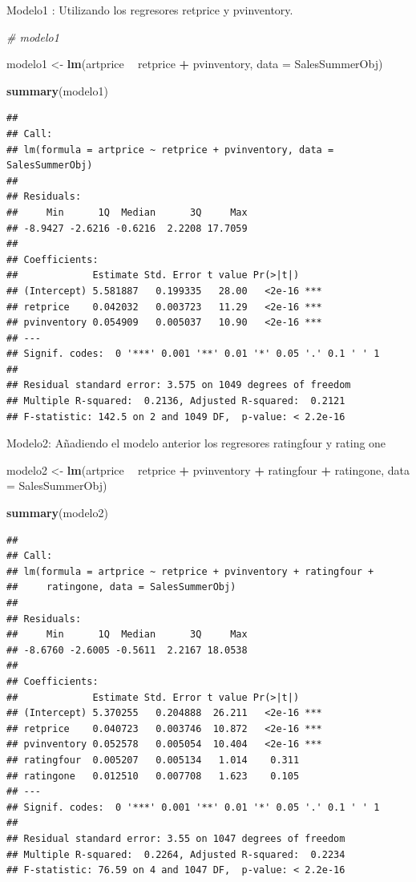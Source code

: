 \documentclass[
]{article}
\newenvironment{Shaded}{\begin{snugshade}}{\end{snugshade}}
\newcommand{\CommentTok}[1]{\textcolor[rgb]{0.56,0.35,0.01}{\textit{#1}}}
\newcommand{\DataTypeTok}[1]{\textcolor[rgb]{0.13,0.29,0.53}{#1}}
\newcommand{\KeywordTok}[1]{\textcolor[rgb]{0.13,0.29,0.53}{\textbf{#1}}}
\newcommand{\NormalTok}[1]{#1}
\newcommand{\OperatorTok}[1]{\textcolor[rgb]{0.81,0.36,0.00}{\textbf{#1}}}
\newcommand{\StringTok}[1]{\textcolor[rgb]{0.31,0.60,0.02}{#1}}
\begin{document}
Modelo1 : Utilizando los regresores retprice y pvinventory.

\begin{Shaded}
\begin{Highlighting}[]
\CommentTok{# modelo1 }


\NormalTok{modelo1 <-}\StringTok{ }\KeywordTok{lm}\NormalTok{(artprice }\OperatorTok{~}\StringTok{ }\NormalTok{retprice }\OperatorTok{+}\StringTok{ }\NormalTok{pvinventory, }\DataTypeTok{data =}\NormalTok{ SalesSummerObj)}

\KeywordTok{summary}\NormalTok{(modelo1)}
\end{Highlighting}
\end{Shaded}

\begin{verbatim}
## 
## Call:
## lm(formula = artprice ~ retprice + pvinventory, data = SalesSummerObj)
## 
## Residuals:
##     Min      1Q  Median      3Q     Max 
## -8.9427 -2.6216 -0.6216  2.2208 17.7059 
## 
## Coefficients:
##             Estimate Std. Error t value Pr(>|t|)    
## (Intercept) 5.581887   0.199335   28.00   <2e-16 ***
## retprice    0.042032   0.003723   11.29   <2e-16 ***
## pvinventory 0.054909   0.005037   10.90   <2e-16 ***
## ---
## Signif. codes:  0 '***' 0.001 '**' 0.01 '*' 0.05 '.' 0.1 ' ' 1
## 
## Residual standard error: 3.575 on 1049 degrees of freedom
## Multiple R-squared:  0.2136, Adjusted R-squared:  0.2121 
## F-statistic: 142.5 on 2 and 1049 DF,  p-value: < 2.2e-16
\end{verbatim}

Modelo2: Añadiendo el modelo anterior los regresores ratingfour y rating
one

\begin{Shaded}
\begin{Highlighting}[]
\NormalTok{modelo2 <-}\StringTok{ }\KeywordTok{lm}\NormalTok{(artprice }\OperatorTok{~}\StringTok{ }\NormalTok{retprice }\OperatorTok{+}\StringTok{ }\NormalTok{pvinventory }\OperatorTok{+}\StringTok{ }\NormalTok{ratingfour }\OperatorTok{+}\StringTok{ }\NormalTok{ratingone, }\DataTypeTok{data =}\NormalTok{ SalesSummerObj)}

\KeywordTok{summary}\NormalTok{(modelo2)}
\end{Highlighting}
\end{Shaded}

\begin{verbatim}
## 
## Call:
## lm(formula = artprice ~ retprice + pvinventory + ratingfour + 
##     ratingone, data = SalesSummerObj)
## 
## Residuals:
##     Min      1Q  Median      3Q     Max 
## -8.6760 -2.6005 -0.5611  2.2167 18.0538 
## 
## Coefficients:
##             Estimate Std. Error t value Pr(>|t|)    
## (Intercept) 5.370255   0.204888  26.211   <2e-16 ***
## retprice    0.040723   0.003746  10.872   <2e-16 ***
## pvinventory 0.052578   0.005054  10.404   <2e-16 ***
## ratingfour  0.005207   0.005134   1.014    0.311    
## ratingone   0.012510   0.007708   1.623    0.105    
## ---
## Signif. codes:  0 '***' 0.001 '**' 0.01 '*' 0.05 '.' 0.1 ' ' 1
## 
## Residual standard error: 3.55 on 1047 degrees of freedom
## Multiple R-squared:  0.2264, Adjusted R-squared:  0.2234 
## F-statistic: 76.59 on 4 and 1047 DF,  p-value: < 2.2e-16
\end{verbatim}
\end{document}
